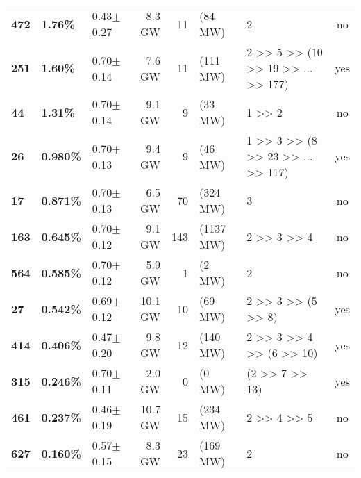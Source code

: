 \begin{tabular}{lllrrllc}
\textbf{472} & \textbf{ 1.76\hphantom{0}\%} &  0.43$\pm$0.27 &       8.3 GW &      11 & (84 MW) & \multicolumn{1}{p{12em}}{                                              2 } &                 no \\
\textbf{251} & \textbf{ 1.60\hphantom{0}\%} &  0.70$\pm$0.14 &       7.6 GW &     11 & (111 MW) & \multicolumn{1}{p{12em}}{             2 >> 5 >> (10 >> 19 >> ... >> 177) } &                yes \\
\textbf{44 } & \textbf{ 1.31\hphantom{0}\%} &  0.70$\pm$0.14 &       9.1 GW &       9 & (33 MW) & \multicolumn{1}{p{12em}}{                                         1 >> 2 } &                 no \\
\textbf{26 } & \textbf{ 0.980\%} &  0.70$\pm$0.13 &       9.4 GW &       9 & (46 MW) & \multicolumn{1}{p{12em}}{              1 >> 3 >> (8 >> 23 >> ... >> 117) } &                yes \\
\textbf{17 } & \textbf{ 0.871\%} &  0.70$\pm$0.13 &       6.5 GW &     70 & (324 MW) & \multicolumn{1}{p{12em}}{                                              3 } &                 no \\
\textbf{163} & \textbf{ 0.645\%} &  0.70$\pm$0.12 &       9.1 GW &   143 & (1137 MW) & \multicolumn{1}{p{12em}}{                                    2 >> 3 >> 4 } &                 no \\
\textbf{564} & \textbf{ 0.585\%} &  0.70$\pm$0.12 &       5.9 GW &        1 & (2 MW) & \multicolumn{1}{p{12em}}{                                              2 } &                 no \\
\textbf{27 } & \textbf{ 0.542\%} &  0.69$\pm$0.12 &      10.1 GW &      10 & (69 MW) & \multicolumn{1}{p{12em}}{                             2 >> 3 >> (5 >> 8) } &                yes \\
\textbf{414} & \textbf{ 0.406\%} &  0.47$\pm$0.20 &       9.8 GW &     12 & (140 MW) & \multicolumn{1}{p{12em}}{                       2 >> 3 >> 4 >> (6 >> 10) } &                yes \\
\textbf{315} & \textbf{ 0.246\%} &  0.70$\pm$0.11 &       2.0 GW &        0 & (0 MW) & \multicolumn{1}{p{12em}}{                                 (2 >> 7 >> 13) } &                yes \\
\textbf{461} & \textbf{ 0.237\%} &  0.46$\pm$0.19 &      10.7 GW &     15 & (234 MW) & \multicolumn{1}{p{12em}}{                                    2 >> 4 >> 5 } &                 no \\
\textbf{627} & \textbf{ 0.160\%} &  0.57$\pm$0.15 &       8.3 GW &     23 & (169 MW) & \multicolumn{1}{p{12em}}{                                              2 } &                 no \\

\end{tabular}
